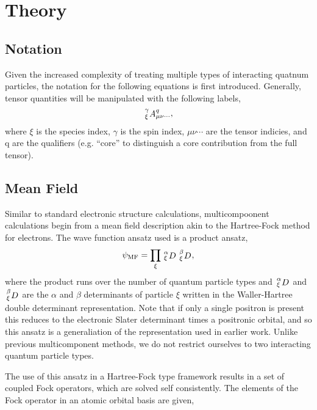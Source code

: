 \section{Theory}
\subsection{Notation}

Given the increased complexity of treating multiple types of interacting quatnum particles, the notation for the following equations is first introduced.
Generally, tensor quantities will be manipulated with the following labels,
\begin{equation}
   \shivten{\gamma}{\xi}{A}{q}{\mu\nu\cdots},
\end{equation}
where $\xi$ is the species index, $\gamma$ is the spin index, $\mu\nu\cdots$ are the tensor indicies, and q are the qualifiers (e.g. ``core'' to distinguish a core contribution from the full tensor).

\subsection{Mean Field}

Similar to standard electronic structure calculations, multicompoonent calculations begin from a mean field description akin to the Hartree-Fock method for electrons.
The wave function ansatz used is a product ansatz, 
\begin{equation}
    \psi_{\textrm{MF}} = \prod_{\xi} \shivten{\alpha}{\xi}{D}{}{} \shivten{\beta}{\xi}{D}{}{},
\end{equation}
where the product runs over the number of quantum particle types and $\shivten{\alpha}{\xi}{D}{}{}$ and $\shivten{\beta}{\xi}{D}{}{}$ are the $\alpha$ and $\beta$ determinants of particle $\xi$ written in the Waller-Hartree double determinant representation.\citehere
Note that if only a single positron is present this reduces to the electronic Slater determinant times a positronic orbital, and so this ansatz is a generaliation of the representation used in earlier work.
Unlike previous multicomponent methods, we do not restrict ourselves to two interacting quantum particle types.

The use of this ansatz in a Hartree-Fock type framework results in a set of coupled Fock operators, which are solved self consistently.
The elements of the Fock operator in an atomic orbital basis are given,

